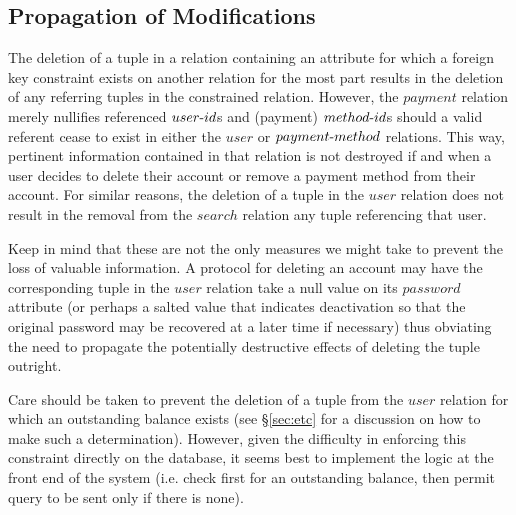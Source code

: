 \documentclass{article}
\newcommand{\tdash}{\textnormal{-}}
\begin{document}
        \subsection{Propagation of Modifications} \label{sec:mods}
            \par The deletion of a tuple in a relation containing an attribute for which a foreign key constraint exists
            on another relation for the most part results in the deletion of any referring tuples in the constrained
            relation. However, the $payment$ relation merely nullifies referenced $user \tdash id$s and (payment)
            $method \tdash id$s should a valid referent cease to exist in either the $user$ or $payment \tdash method$
            relations. This way, pertinent information contained in that relation is not destroyed if and when a user
            decides to delete their account or remove a payment method from their account. For similar reasons, the
            deletion of a tuple in the $user$ relation does not result in the removal from the $search$ relation any
            tuple referencing that user. \par Keep in mind that these are not the only measures we might take to
            prevent the loss of valuable information. A protocol for deleting an account may have the corresponding
            tuple in the $user$ relation take a null value on its $password$ attribute (or perhaps a salted value that
            indicates deactivation so that the original password may be recovered at a later time if necessary) thus
            obviating the need to propagate the potentially destructive effects of deleting the tuple outright. \par
            Care should be taken to prevent the deletion of a tuple from the $user$ relation for which an outstanding
            balance exists (see \S \ref{sec:etc} for a discussion on how to make such a determination). However, given
            the difficulty in enforcing this constraint directly on the database, it seems best to implement the logic
            at the front end of the system (i.e. check first for an outstanding balance, then permit query to be sent
            only if there is none).
\end{document}
